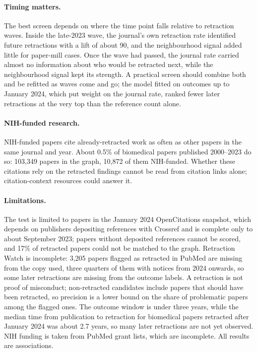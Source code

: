 \paragraph{Timing matters.} The best screen depends on where the time point falls relative to retraction waves. Inside
the late-2023 wave, the journal's own retraction rate identified future retractions with a lift of about 90, and the
neighbourhood signal added little for paper-mill cases. Once the wave had passed, the journal rate carried almost no
information about who would be retracted next, while the neighbourhood signal kept its strength. A practical screen
should combine both and be refitted as waves come and go; the model fitted on outcomes up to January 2024, which put weight on the journal
rate, ranked fewer later retractions at the very top than the reference count alone.

\paragraph{NIH-funded research.} NIH-funded papers cite already-retracted work as often as other papers in the same
journal and year. About 0.5\% of biomedical papers published 2000--2023 do so: 103,349 papers in the graph, 10,872 of them
NIH-funded. Whether these citations rely on the retracted findings cannot be read from
citation links alone; citation-context resources \citep{joseph2026sanecite,hsiao2021continued} could answer it.

\paragraph{Limitations.} The test is limited to papers in the January 2024 OpenCitations snapshot, which depends on
publishers depositing references with Crossref and is complete only to about September 2023; papers without deposited
references cannot be scored, and 17\% of retracted papers could not be matched to the graph. Retraction Watch is
incomplete: 3,205 papers flagged as retracted in PubMed are missing from the copy used, three quarters of them with
notices from 2024 onwards, so some later retractions are missing from the outcome labels. A retraction is not proof of
misconduct; non-retracted candidates include papers that should have been
retracted, so precision is a lower bound on the share of problematic papers among the flagged ones. The outcome window
is under three years, while the median time from publication to retraction for biomedical papers retracted after January
2024 was about 2.7 years, so
many later retractions are not yet observed. NIH funding is taken from PubMed grant lists, which are incomplete. All
results are associations.
